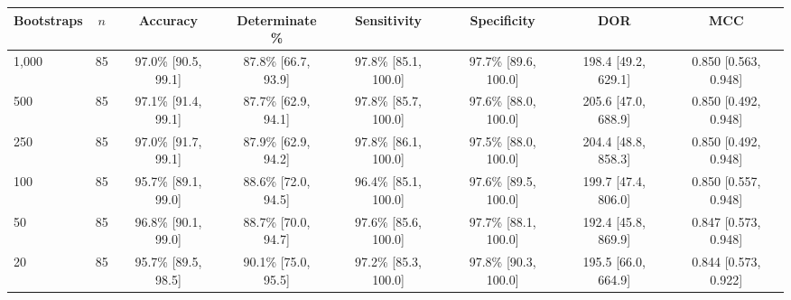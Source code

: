 \begin{tabular}{lccccccc}
\toprule
Bootstraps & $n$ & Accuracy & Determinate \% & Sensitivity & Specificity & DOR & MCC \\
\midrule
1,000 & 85 & 97.0\% [90.5, 99.1] & 87.8\% [66.7, 93.9] & 97.8\% [85.1, 100.0] & 97.7\% [89.6, 100.0] & 198.4 [49.2, 629.1] & 0.850 [0.563, 0.948] \\
500 & 85 & 97.1\% [91.4, 99.1] & 87.7\% [62.9, 94.1] & 97.8\% [85.7, 100.0] & 97.6\% [88.0, 100.0] & 205.6 [47.0, 688.9] & 0.850 [0.492, 0.948] \\
250 & 85 & 97.0\% [91.7, 99.1] & 87.9\% [62.9, 94.2] & 97.8\% [86.1, 100.0] & 97.5\% [88.0, 100.0] & 204.4 [48.8, 858.3] & 0.850 [0.492, 0.948] \\
100 & 85 & 95.7\% [89.1, 99.0] & 88.6\% [72.0, 94.5] & 96.4\% [85.1, 100.0] & 97.6\% [89.5, 100.0] & 199.7 [47.4, 806.0] & 0.850 [0.557, 0.948] \\
50 & 85 & 96.8\% [90.1, 99.0] & 88.7\% [70.0, 94.7] & 97.6\% [85.6, 100.0] & 97.7\% [88.1, 100.0] & 192.4 [45.8, 869.9] & 0.847 [0.573, 0.948] \\
20 & 85 & 95.7\% [89.5, 98.5] & 90.1\% [75.0, 95.5] & 97.2\% [85.3, 100.0] & 97.8\% [90.3, 100.0] & 195.5 [66.0, 664.9] & 0.844 [0.573, 0.922] \\
\bottomrule
\end{tabular}
